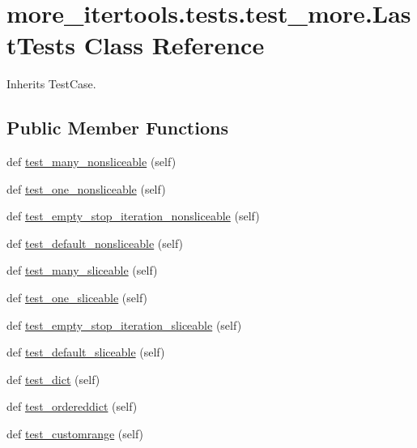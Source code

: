 \hypertarget{classmore__itertools_1_1tests_1_1test__more_1_1_last_tests}{}\section{more\+\_\+itertools.\+tests.\+test\+\_\+more.\+Last\+Tests Class Reference}
\label{classmore__itertools_1_1tests_1_1test__more_1_1_last_tests}


Inherits Test\+Case.

\subsection*{Public Member Functions}
\begin{DoxyCompactItemize}
\item 
def \hyperlink{classmore__itertools_1_1tests_1_1test__more_1_1_last_tests_ac0a03696aa7a5bc37ceaa53f43b9dff0}{test\+\_\+many\+\_\+nonsliceable} (self)
\item 
def \hyperlink{classmore__itertools_1_1tests_1_1test__more_1_1_last_tests_a0b78120bf3650e204a5de1cc3841af69}{test\+\_\+one\+\_\+nonsliceable} (self)
\item 
def \hyperlink{classmore__itertools_1_1tests_1_1test__more_1_1_last_tests_aa3389807eeed016b1defa039c66a5a0f}{test\+\_\+empty\+\_\+stop\+\_\+iteration\+\_\+nonsliceable} (self)
\item 
def \hyperlink{classmore__itertools_1_1tests_1_1test__more_1_1_last_tests_a3b23a3df95a1c107c20ee18073972261}{test\+\_\+default\+\_\+nonsliceable} (self)
\item 
def \hyperlink{classmore__itertools_1_1tests_1_1test__more_1_1_last_tests_a9918a53f25552f73c5431f17675b95b8}{test\+\_\+many\+\_\+sliceable} (self)
\item 
def \hyperlink{classmore__itertools_1_1tests_1_1test__more_1_1_last_tests_a1f0731ed7db3acdfb88960019c73f1a9}{test\+\_\+one\+\_\+sliceable} (self)
\item 
def \hyperlink{classmore__itertools_1_1tests_1_1test__more_1_1_last_tests_ab14eabb9f868e05e3dc9f6786b63423b}{test\+\_\+empty\+\_\+stop\+\_\+iteration\+\_\+sliceable} (self)
\item 
def \hyperlink{classmore__itertools_1_1tests_1_1test__more_1_1_last_tests_a07d22aaf42f41355db2fb55533f4c055}{test\+\_\+default\+\_\+sliceable} (self)
\item 
def \hyperlink{classmore__itertools_1_1tests_1_1test__more_1_1_last_tests_a01c570323b597371e3e02ebdc0c9a1b1}{test\+\_\+dict} (self)
\item 
def \hyperlink{classmore__itertools_1_1tests_1_1test__more_1_1_last_tests_aedc2c18a8a54233f5a45e6e6942dde5d}{test\+\_\+ordereddict} (self)
\item 
def \hyperlink{classmore__itertools_1_1tests_1_1test__more_1_1_last_tests_a5a45456752bab8aa066b447ad42f75b4}{test\+\_\+customrange} (self)
\end{DoxyCompactItemize}


